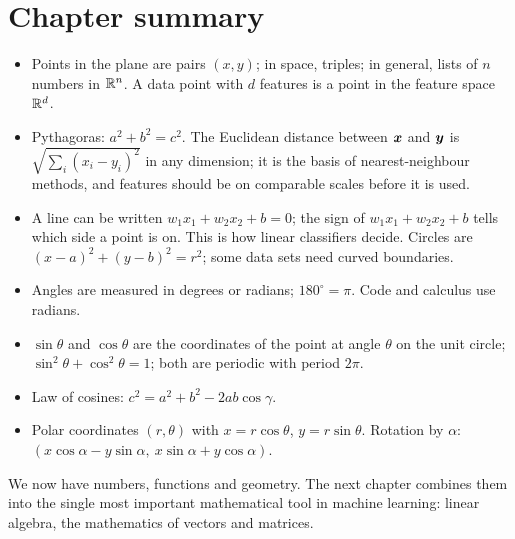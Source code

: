 \section{Chapter summary}\label{sec:ch3-summary}

\begin{keytakeaways}
\begin{itemize}
  \item Points in the plane are pairs $(x, y)$; in space, triples; in general,
    lists of $n$ numbers in $\mathbb{R}^n$. A data point with $d$ features is a point
    in the feature space $\mathbb{R}^d$.
  \item Pythagoras: $a^2 + b^2 = c^2$. The Euclidean distance between
    $\bm{x}$ and $\bm{y}$ is $\sqrt{\sum_i (x_i - y_i)^2}$ in any dimension; it is
    the basis of nearest-neighbour methods, and features should be on
    comparable scales before it is used.
  \item A line can be written $w_1x_1 + w_2x_2 + b = 0$; the sign of
    $w_1x_1 + w_2x_2 + b$ tells which side a point is on. This is how linear
    classifiers decide. Circles are $(x-a)^2 + (y-b)^2 = r^2$; some data sets
    need curved boundaries.
  \item Angles are measured in degrees or radians; $180^\circ = \pi$. Code and
    calculus use radians.
  \item $\sin\theta$ and $\cos\theta$ are the coordinates of the point at angle
    $\theta$ on the unit circle; $\sin^2\theta + \cos^2\theta = 1$; both are
    periodic with period $2\pi$.
  \item Law of cosines: $c^2 = a^2 + b^2 - 2ab\cos\gamma$.
  \item Polar coordinates $(r, \theta)$ with $x = r\cos\theta$,
    $y = r\sin\theta$. Rotation by $\alpha$:
    $(x\cos\alpha - y\sin\alpha,\ x\sin\alpha + y\cos\alpha)$.
\end{itemize}
\end{keytakeaways}

We now have numbers, functions and geometry. The next chapter combines them
into the single most important mathematical tool in machine learning: linear
algebra, the mathematics of vectors and matrices.
